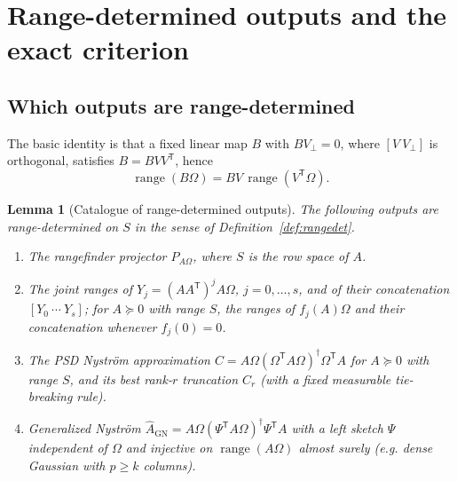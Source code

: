\documentclass[11pt,a4paper]{article}
\newtheorem{lemma}[theorem]{Lemma}
\theoremstyle{definition}
\theoremstyle{remark}
\numberwithin{equation}{section}
\newcommand{\T}{{\mathsf T}}
\newcommand{\range}{\operatorname{range}}
\newcommand{\GN}{\mathrm{GN}}
\begin{document}
\section{Range-determined outputs and the exact criterion}\label{sec:iff}

\subsection{Which outputs are range-determined}

The basic identity is that a fixed linear map $B$ with $BV_\perp=0$, where
$[V\ V_\perp]$ is orthogonal, satisfies $B=BVV^\T$, hence
\begin{equation}\label{eq:basic}
 \range(B\Omega)=BV\,\range(V^\T\Omega).
\end{equation}

\begin{lemma}[Catalogue of range-determined outputs]\label{lem:catalogue}
The following outputs are range-determined on $S$ in the sense of
Definition~\ref{def:rangedet}.
\begin{enumerate}[label=\textup{(\alph*)}]
\item The rangefinder projector $P_{A\Omega}$, where $S$ is the row space of $A$.
\item The joint ranges of $Y_j=(AA^\T)^jA\Omega$, $j=0,\ldots,s$, and of
      their concatenation $[Y_0\ \cdots\ Y_s]$; for $A\succeq0$ with range $S$,
      the ranges of $f_j(A)\Omega$ and their concatenation whenever $f_j(0)=0$.
\item The PSD Nystr\"om approximation
      $C=A\Omega(\Omega^\T A\Omega)^\dagger\Omega^\T A$ for $A\succeq0$ with range
      $S$, and its best rank-$r$ truncation $C_r$ (with a fixed measurable
      tie-breaking rule).
\item Generalized Nystr\"om $\widehat A_\GN=A\Omega(\Psi^\T A\Omega)^\dagger\Psi^\T A$
      with a left sketch $\Psi$ independent of $\Omega$ and injective on
      $\range(A\Omega)$ almost surely (e.g. dense Gaussian with $p\ge k$
      columns).
\end{enumerate}
\end{lemma}
\end{document}
